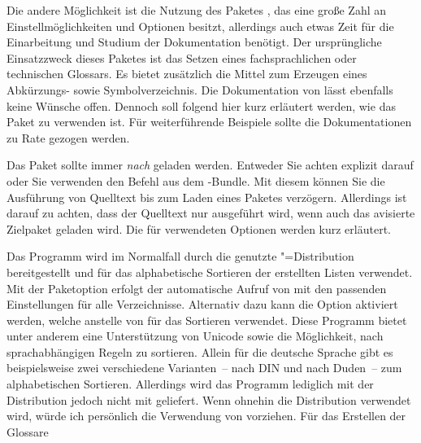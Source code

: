 \documentclass[%
  english,ngerman,%
  geometry=no,DIV=12,automark,%
]{tudscrartcl}
\begin{document}
Die andere Möglichkeit ist die Nutzung des Paketes , das 
eine große Zahl an Einstellmöglichkeiten und Optionen besitzt, allerdings auch 
etwas Zeit für die Einarbeitung und Studium der Dokumentation benötigt. Der 
ursprüngliche Einsatzzweck dieses Paketes ist das Setzen eines fachsprachlichen 
oder technischen Glossars. Es bietet zusätzlich die Mittel zum Erzeugen eines 
Abkürzungs- sowie Symbolverzeichnis. Die Dokumentation von  
lässt ebenfalls keine Wünsche offen. Dennoch soll folgend hier kurz erläutert 
werden, wie das Paket zu verwenden ist. Für weiterführende Beispiele sollte 
die Dokumentationen zu Rate gezogen werden.

Das Paket  sollte immer \emph{nach}  
geladen werden. Entweder Sie achten explizit darauf oder Sie verwenden den 
Befehl  aus dem \KOMAScript-Bundle. Mit diesem können Sie 
die Ausführung von Quelltext bis zum Laden eines Paketes verzögern. Allerdings 
ist darauf zu achten, dass der Quelltext nur ausgeführt wird, wenn auch das 
avisierte Zielpaket geladen wird. Die für  verwendeten 
Optionen werden kurz erläutert.
%
\begin{Preamble+}
\AfterPackage*{hyperref}{%
\end{Preamble+}
\begin{Preamble}
\usepackage[%
\end{Preamble}
%
Das Programm  wird im Normalfall durch die genutzte 
"=Distribution bereitgestellt und für das alphabetische Sortieren 
der erstellten Listen verwendet. Mit der Paketoption  erfolgt 
der automatische Aufruf von  mit den passenden 
Einstellungen für alle Verzeichnisse. Alternativ dazu kann die Option 
 aktiviert werden, welche  anstelle von 
 für das Sortieren verwendet. Diese Programm bietet 
unter anderem eine Unterstützung von Unicode sowie die Möglichkeit, nach 
sprachabhängigen Regeln zu sortieren. Allein für die deutsche Sprache gibt es 
beispielsweise zwei verschiedene Varianten~-- nach DIN und nach Duden~-- zum 
alphabetischen Sortieren. Allerdings wird das Programm  
lediglich mit der Distribution  jedoch nicht 
mit  geliefert. Wenn ohnehin die Distribution 
 verwendet wird, würde ich persönlich die 
Verwendung von  vorziehen. Für das Erstellen der Glossare 
\end{document}
